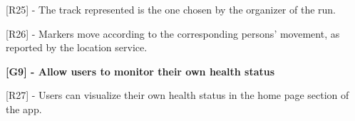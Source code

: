 [R25] - The track represented is the one chosen by the organizer of the run. \newline

[R26] - Markers move according to the corresponding persons' movement, as reported by the location service. \newline

\hspace{-\parindent}\textbf{[G9] - Allow users to monitor their own health status} \newline

[R27] - Users can visualize their own health status in the home page section of the app. \newline

%